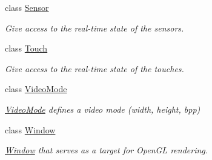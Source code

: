 \begin{DoxyCompactItemize}
class \hyperlink{classsf_1_1_sensor}{Sensor}
\begin{DoxyCompactList}\small\item\em Give access to the real-\/time state of the sensors. \end{DoxyCompactList}\item 
class \hyperlink{classsf_1_1_touch}{Touch}
\begin{DoxyCompactList}\small\item\em Give access to the real-\/time state of the touches. \end{DoxyCompactList}\item 
class \hyperlink{classsf_1_1_video_mode}{Video\-Mode}
\begin{DoxyCompactList}\small\item\em \hyperlink{classsf_1_1_video_mode}{Video\-Mode} defines a video mode (width, height, bpp) \end{DoxyCompactList}\item 
class \hyperlink{classsf_1_1_window}{Window}
\begin{DoxyCompactList}\small\item\em \hyperlink{classsf_1_1_window}{Window} that serves as a target for Open\-G\-L rendering. \end{DoxyCompactList}\end{DoxyCompactItemize}
